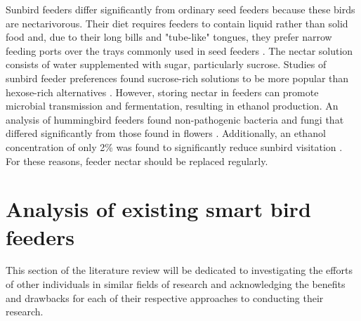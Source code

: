 Sunbird feeders differ significantly from ordinary seed feeders because these birds are nectarivorous. Their diet requires feeders to contain liquid rather than solid food and, due to their long bills and "tube-like" tongues, they prefer narrow feeding ports over the trays commonly used in seed feeders \cite{CubanEtAl2026}. The nectar solution consists of water supplemented with sugar, particularly sucrose. Studies of sunbird feeder preferences found sucrose-rich solutions to be more popular than hexose-rich alternatives \cite{FlemingEtAl2004}. However, storing nectar in feeders can promote microbial transmission and fermentation, resulting in ethanol production. An analysis of hummingbird feeders found non-pathogenic bacteria and fungi that differed significantly from those found in flowers \cite{LeeEtAl2019}. Additionally, an ethanol concentration of only 2\% was found to significantly reduce sunbird visitation \cite{ChoiEtAl2023}. For these reasons, feeder nectar should be replaced regularly.

\section{Analysis of existing smart bird feeders}


This section of the literature review will be dedicated to investigating the efforts of other individuals in similar fields of research and acknowledging the benefits and drawbacks for each of their respective approaches to conducting their research. 
\par\vspace{6pt}

